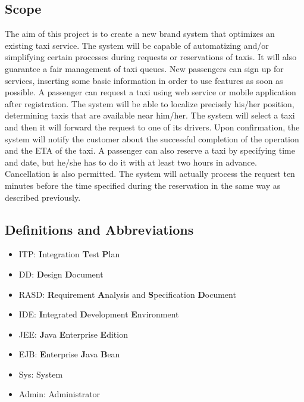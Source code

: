 \subsection{Scope}
The aim of this project is to create a new brand system that optimizes an 
existing taxi service.
The system will be capable of automatizing and/or simplifying certain 
processes during requests or reservations of taxis.
It will also guarantee a fair management of taxi queues.
New passengers can sign up for services, inserting some basic information in order to use features as soon as possible.
A passenger can request a taxi using web service or mobile
application after registration. The system will be able to localize precisely his/her position, determining taxis that are available near
him/her. The system will select a taxi and then it will forward the request to one of its drivers.
Upon confirmation, the system will notify the customer about the successful completion of the operation and the ETA of the taxi. A passenger can also reserve a taxi by specifying time and date, but he/she has to do it with at least two hours in advance. Cancellation is also permitted. The system will actually process the request ten minutes before the time specified during the reservation in the same way as described previously.
\subsection{Definitions and Abbreviations}
\begin{itemize}
	\item ITP: \textbf{I}ntegration \textbf{T}est \textbf{P}lan
	\item DD: \textbf{D}esign \textbf{D}ocument
	\item RASD: \textbf{R}equirement \textbf{A}nalysis and \textbf{S}pecification \textbf{D}ocument
	\item IDE: \textbf{I}ntegrated \textbf{D}evelopment \textbf{E}nvironment
	\item JEE: \textbf{J}ava \textbf{E}nterprise \textbf{E}dition
	\item EJB: \textbf{E}nterprise \textbf{J}ava \textbf{B}ean
	\item Sys: System
	\item Admin: Administrator
\end{itemize}
